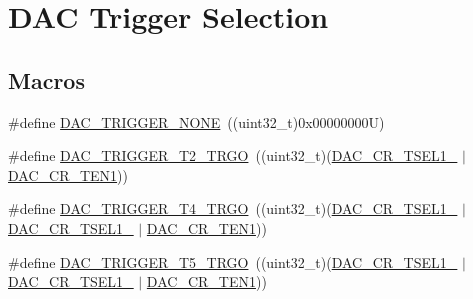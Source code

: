 \hypertarget{group___d_a_c__trigger__selection}{}\section{D\+AC Trigger Selection}
\label{group___d_a_c__trigger__selection}
\subsection*{Macros}
\begin{DoxyCompactItemize}
\item 
\#define \mbox{\hyperlink{group___d_a_c__trigger__selection_ga9b7e1a1ac776ce97f65ffacb99e8f01e}{D\+A\+C\+\_\+\+T\+R\+I\+G\+G\+E\+R\+\_\+\+N\+O\+NE}}~((uint32\+\_\+t)0x00000000\+U)
\item 
\#define \mbox{\hyperlink{group___d_a_c__trigger__selection_ga22ceec14e367d69b762460b18ee92c2f}{D\+A\+C\+\_\+\+T\+R\+I\+G\+G\+E\+R\+\_\+\+T2\+\_\+\+T\+R\+GO}}~((uint32\+\_\+t)(\mbox{\hyperlink{group___peripheral___registers___bits___definition_gaa625d7638422e90a616ac93edd4bf408}{D\+A\+C\+\_\+\+C\+R\+\_\+\+T\+S\+E\+L1\+\_}} $\vert$ \mbox{\hyperlink{group___peripheral___registers___bits___definition_ga998aa4fd791ea2f4626df6ddc8fc7109}{D\+A\+C\+\_\+\+C\+R\+\_\+\+T\+E\+N1}}))
\item 
\#define \mbox{\hyperlink{group___d_a_c__trigger__selection_ga8b8af83b9df4fd42495c6813a09ef7ae}{D\+A\+C\+\_\+\+T\+R\+I\+G\+G\+E\+R\+\_\+\+T4\+\_\+\+T\+R\+GO}}~((uint32\+\_\+t)(\mbox{\hyperlink{group___peripheral___registers___bits___definition_gaa625d7638422e90a616ac93edd4bf408}{D\+A\+C\+\_\+\+C\+R\+\_\+\+T\+S\+E\+L1\+\_}} $\vert$ \mbox{\hyperlink{group___peripheral___registers___bits___definition_ga8dfa13ec123c583136e24b7890add45b}{D\+A\+C\+\_\+\+C\+R\+\_\+\+T\+S\+E\+L1\+\_}} $\vert$ \mbox{\hyperlink{group___peripheral___registers___bits___definition_ga998aa4fd791ea2f4626df6ddc8fc7109}{D\+A\+C\+\_\+\+C\+R\+\_\+\+T\+E\+N1}}))
\item 
\#define \mbox{\hyperlink{group___d_a_c__trigger__selection_gaedb5ca1f0e01baaaabe5884ecfa5c7d5}{D\+A\+C\+\_\+\+T\+R\+I\+G\+G\+E\+R\+\_\+\+T5\+\_\+\+T\+R\+GO}}~((uint32\+\_\+t)(\mbox{\hyperlink{group___peripheral___registers___bits___definition_ga265e32c4fc43310acdf3ebea01376766}{D\+A\+C\+\_\+\+C\+R\+\_\+\+T\+S\+E\+L1\+\_}} $\vert$ \mbox{\hyperlink{group___peripheral___registers___bits___definition_ga8dfa13ec123c583136e24b7890add45b}{D\+A\+C\+\_\+\+C\+R\+\_\+\+T\+S\+E\+L1\+\_}} $\vert$ \mbox{\hyperlink{group___peripheral___registers___bits___definition_ga998aa4fd791ea2f4626df6ddc8fc7109}{D\+A\+C\+\_\+\+C\+R\+\_\+\+T\+E\+N1}}))

\end{DoxyCompactItemize}
